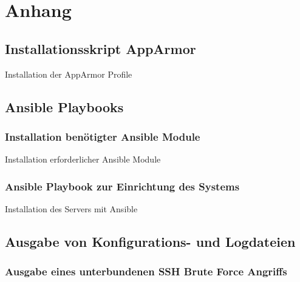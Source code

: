 \section{Anhang}

\subsection{Installationsskript AppArmor}

\begin{listing}[ht]{}
    \caption{Installation der AppArmor Profile}
    \label{listing:installation_apparmor}
\end{listing}

\subsection{Ansible Playbooks}

\subsubsection{Installation benötigter Ansible Module}
\begin{listing}
    \caption{Installation erforderlicher Ansible Module}
    \label{listing:ansible_module_installation}
\end{listing}


\subsubsection{Ansible Playbook zur Einrichtung des Systems}
\begin{longlisting}
    \caption{Installation des Servers mit Ansible}
    \label{listing:ansible_playbook}
\end{longlisting}

\subsection{Ausgabe von Konfigurations- und Logdateien}

\subsubsection{Ausgabe eines unterbundenen SSH Brute Force Angriffs}
\inputminted[breaklines=true,firstline=34, lastline=42]{text}{code/output/sshguard.txt}
